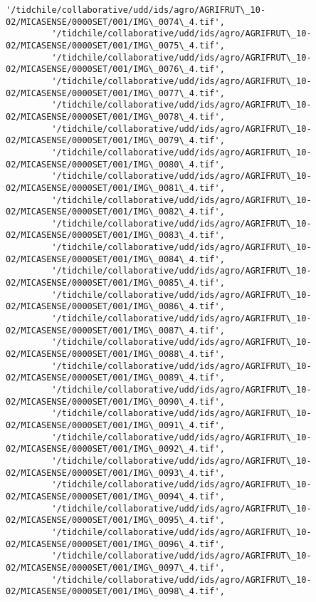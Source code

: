\documentclass[11pt]{article}
\begin{document}
\begin{Verbatim}[commandchars=\\\{\}]
         '/tidchile/collaborative/udd/ids/agro/AGRIFRUT\_10-02/MICASENSE/0000SET/001/IMG\_0074\_4.tif',
         '/tidchile/collaborative/udd/ids/agro/AGRIFRUT\_10-02/MICASENSE/0000SET/001/IMG\_0075\_4.tif',
         '/tidchile/collaborative/udd/ids/agro/AGRIFRUT\_10-02/MICASENSE/0000SET/001/IMG\_0076\_4.tif',
         '/tidchile/collaborative/udd/ids/agro/AGRIFRUT\_10-02/MICASENSE/0000SET/001/IMG\_0077\_4.tif',
         '/tidchile/collaborative/udd/ids/agro/AGRIFRUT\_10-02/MICASENSE/0000SET/001/IMG\_0078\_4.tif',
         '/tidchile/collaborative/udd/ids/agro/AGRIFRUT\_10-02/MICASENSE/0000SET/001/IMG\_0079\_4.tif',
         '/tidchile/collaborative/udd/ids/agro/AGRIFRUT\_10-02/MICASENSE/0000SET/001/IMG\_0080\_4.tif',
         '/tidchile/collaborative/udd/ids/agro/AGRIFRUT\_10-02/MICASENSE/0000SET/001/IMG\_0081\_4.tif',
         '/tidchile/collaborative/udd/ids/agro/AGRIFRUT\_10-02/MICASENSE/0000SET/001/IMG\_0082\_4.tif',
         '/tidchile/collaborative/udd/ids/agro/AGRIFRUT\_10-02/MICASENSE/0000SET/001/IMG\_0083\_4.tif',
         '/tidchile/collaborative/udd/ids/agro/AGRIFRUT\_10-02/MICASENSE/0000SET/001/IMG\_0084\_4.tif',
         '/tidchile/collaborative/udd/ids/agro/AGRIFRUT\_10-02/MICASENSE/0000SET/001/IMG\_0085\_4.tif',
         '/tidchile/collaborative/udd/ids/agro/AGRIFRUT\_10-02/MICASENSE/0000SET/001/IMG\_0086\_4.tif',
         '/tidchile/collaborative/udd/ids/agro/AGRIFRUT\_10-02/MICASENSE/0000SET/001/IMG\_0087\_4.tif',
         '/tidchile/collaborative/udd/ids/agro/AGRIFRUT\_10-02/MICASENSE/0000SET/001/IMG\_0088\_4.tif',
         '/tidchile/collaborative/udd/ids/agro/AGRIFRUT\_10-02/MICASENSE/0000SET/001/IMG\_0089\_4.tif',
         '/tidchile/collaborative/udd/ids/agro/AGRIFRUT\_10-02/MICASENSE/0000SET/001/IMG\_0090\_4.tif',
         '/tidchile/collaborative/udd/ids/agro/AGRIFRUT\_10-02/MICASENSE/0000SET/001/IMG\_0091\_4.tif',
         '/tidchile/collaborative/udd/ids/agro/AGRIFRUT\_10-02/MICASENSE/0000SET/001/IMG\_0092\_4.tif',
         '/tidchile/collaborative/udd/ids/agro/AGRIFRUT\_10-02/MICASENSE/0000SET/001/IMG\_0093\_4.tif',
         '/tidchile/collaborative/udd/ids/agro/AGRIFRUT\_10-02/MICASENSE/0000SET/001/IMG\_0094\_4.tif',
         '/tidchile/collaborative/udd/ids/agro/AGRIFRUT\_10-02/MICASENSE/0000SET/001/IMG\_0095\_4.tif',
         '/tidchile/collaborative/udd/ids/agro/AGRIFRUT\_10-02/MICASENSE/0000SET/001/IMG\_0096\_4.tif',
         '/tidchile/collaborative/udd/ids/agro/AGRIFRUT\_10-02/MICASENSE/0000SET/001/IMG\_0097\_4.tif',
         '/tidchile/collaborative/udd/ids/agro/AGRIFRUT\_10-02/MICASENSE/0000SET/001/IMG\_0098\_4.tif',

\end{Verbatim}
\end{document}

